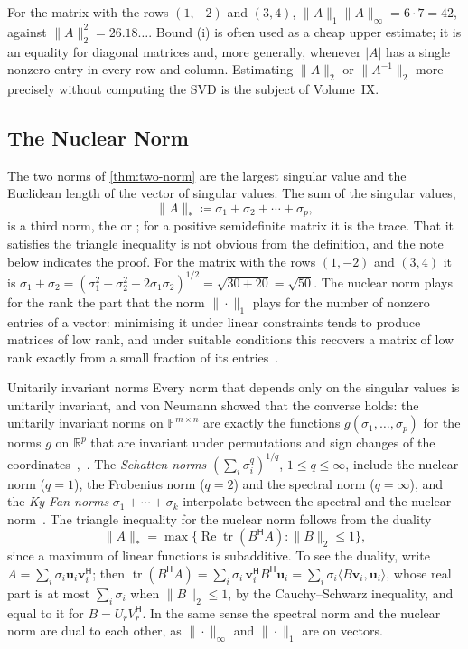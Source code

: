 For the matrix with the rows $(1,-2)$ and $(3,4)$, $\|A\|_1\|A\|_\infty=6\cdot7=42$, against $\|A\|_2^2=26.18\ldots$. Bound (i) is often used as a cheap upper estimate; it is an equality for diagonal matrices and, more generally, whenever $|A|$ has a single nonzero entry in every row and column. Estimating $\|A\|_2$ or $\|A^{-1}\|_2$ more precisely without computing the SVD is the subject of Volume~IX.

\subsection{The Nuclear Norm}

The two norms of \cref{thm:two-norm} are the largest singular value and the Euclidean length of the vector of singular values. The sum of the singular values,
\[
\|A\|_*\coloneqq\sigma_1+\sigma_2+\cdots+\sigma_p ,
\]
is a third norm, the  or ; for a positive semidefinite matrix it is the trace. That it satisfies the triangle inequality is not obvious from the definition, and the note below indicates the proof. For the matrix with the rows $(1,-2)$ and $(3,4)$ it is $\sigma_1+\sigma_2=(\sigma_1^2+\sigma_2^2+2\sigma_1\sigma_2)^{1/2}=\sqrt{30+20}=\sqrt{50}$. The nuclear norm plays for the rank the part that the norm $\|\cdot\|_1$ plays for the number of nonzero entries of a vector: minimising it under linear constraints tends to produce matrices of low rank, and under suitable conditions this recovers a matrix of low rank exactly from a small fraction of its entries~\cite{candes2009}.

\begin{note}{Unitarily invariant norms}
Every norm that depends only on the singular values is unitarily invariant, and von Neumann showed that the converse holds: the unitarily invariant norms on $\mathbb F^{m\times n}$ are exactly the functions $g(\sigma_1,\ldots,\sigma_p)$ for the norms $g$ on $\mathbb R^p$ that are invariant under permutations and sign changes of the coordinates~\cite{vonneumann1937},~\cite[Sect.~7.4]{horn2013}. The \emph{Schatten norms} $(\sum_i\sigma_i^q)^{1/q}$, $1\le q\le\infty$, include the nuclear norm ($q=1$), the Frobenius norm ($q=2$) and the spectral norm ($q=\infty$), and the \emph{Ky Fan norms} $\sigma_1+\cdots+\sigma_k$ interpolate between the spectral and the nuclear norm~\cite{fan1951}. The triangle inequality for the nuclear norm follows from the duality
\[
\|A\|_*=\max\bigl\{\operatorname{Re}\operatorname{tr}(B^{\mathsf H}A):\|B\|_2\le1\bigr\},
\]
since a maximum of linear functions is subadditive. To see the duality, write $A=\sum_i\sigma_i\mathbf u_i\mathbf v_i^{\mathsf H}$; then $\operatorname{tr}(B^{\mathsf H}A)=\sum_i\sigma_i\,\mathbf v_i^{\mathsf H}B^{\mathsf H}\mathbf u_i=\sum_i\sigma_i\langle B\mathbf v_i,\mathbf u_i\rangle$, whose real part is at most $\sum_i\sigma_i$ when $\|B\|_2\le1$, by the Cauchy--Schwarz inequality, and equal to it for $B=U_rV_r^{\mathsf H}$. In the same sense the spectral norm and the nuclear norm are dual to each other, as $\|\cdot\|_\infty$ and $\|\cdot\|_1$ are on vectors.
\end{note}

